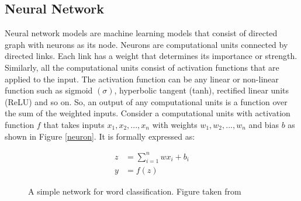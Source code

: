 \documentclass[12pt]{report} %
\begin{document}
\subsection{Neural Network}

Neural network models are machine learning models that consist of directed graph with neurons as its node. Neurons are computational units connected by directed links. Each link has a weight that determines its importance or strength. Similarly, all the computational units consist of activation functions that are applied to the input. The activation function can be any linear or non-linear function such as sigmoid $(\sigma)$, hyperbolic tangent (tanh), rectified linear units (ReLU) and so on. So, an output of any computational units is a function over the sum of the weighted inputs. Consider a computational units with activation function $f$ that takes inputs $x_{1},x_{2},...,x_{n}$ with weights $w_{1},w_{2},...,w_{n}$ and bias $b$ as shown in Figure \ref{neuron}. It is formally expressed as:

\begin{align}
z & = \sum_{i=1}^{n} wx_i + b_i \\
y & = f(z)
\end{align}

\begin{figure}[!htbp]
	\centering
	\caption{A simple network for word classification. Figure taken from \cite{bowman2016modeling}}
	\label{network}
\end{figure}
\end{document}
